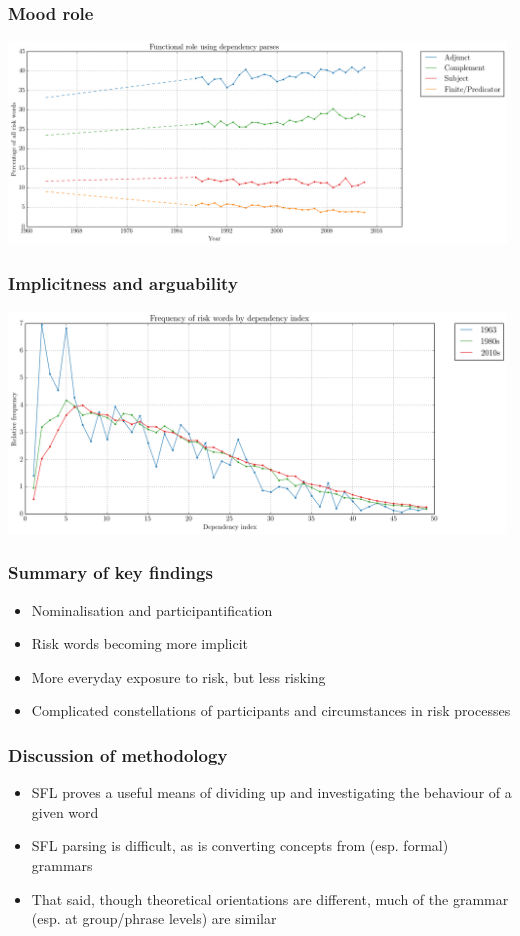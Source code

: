 \documentclass{beamer}       %
\begin{document}
\begin{frame}
    \frametitle{Mood role}
    \centering
    \includegraphics[width=0.99\textwidth]{../images/functional_role_using_dependency_parses}
\end{frame}

\begin{frame}
    \frametitle{Implicitness and arguability}
    \centering
    \includegraphics[width=0.99\textwidth]{../images/frequency-of-risk-words-by-dependency-index.png}
\end{frame}

\begin{frame}
    \frametitle{Summary of key findings}
    
    \begin{itemize}
    \item Nominalisation and participantification
    \item Risk words becoming more implicit
    \item More everyday exposure to risk, but less risking
    \item Complicated constellations of participants and circumstances in risk processes
    \end{itemize}
\end{frame}

\begin{frame}
    \frametitle{Discussion of methodology}
    
    \begin{itemize}
    \item SFL proves a useful means of dividing up and investigating the behaviour of a given word
    \item SFL parsing is difficult, as is converting concepts from (esp. formal) grammars
    \item That said, though theoretical orientations are different, much of the grammar (esp. at group\slash phrase levels) are similar
    \end{itemize}
\end{frame}
\end{document}
